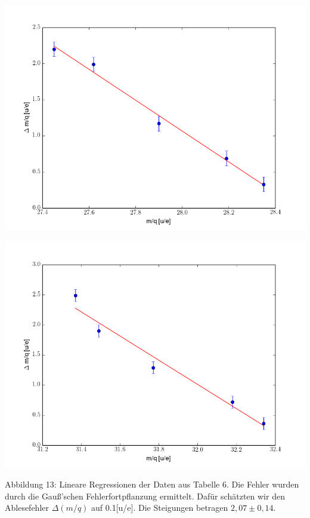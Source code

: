 \begin{center}
\begin{minipage}[t]{0.49\textwidth}
\includegraphics[width=\textwidth]{img/mq1}
\end{minipage}
\begin{minipage}[t]{0.49\textwidth}
\includegraphics[width=\textwidth]{img/mq2}
\end{minipage}
\end{center}

Abbildung 13: Lineare Regressionen der Daten aus Tabelle 6. Die Fehler wurden \hspace*{2,5cm} durch die Gauß’schen Fehlerfortpflanzung ermittelt. Dafür schätzten \hspace*{2,5cm} wir den Ablesefehler $\Delta(m/q)$ auf 0.1[u/e]. Die Steigungen betragen \hspace*{2,5cm} $2,07\pm 0,14$.
